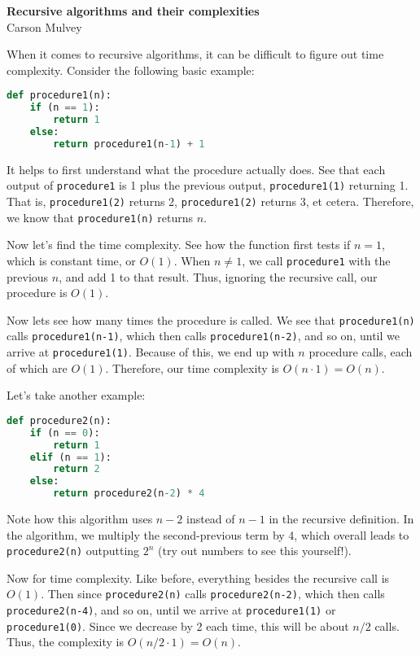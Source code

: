 \documentclass[11pt,letterpaper,dvipsnames]{article}
\begin{document}

\begin{center}
    \begin{large}
        \textbf{Recursive algorithms and their complexities} \\
        Carson Mulvey
    \end{large}
\end{center}

When it comes to recursive algorithms, it can be difficult to figure out time complexity. Consider the following basic example:
\begin{lstlisting}[language=Python]    
def procedure1(n):
    if (n == 1):
        return 1
    else:
        return procedure1(n-1) + 1
\end{lstlisting}

It helps to first understand what the procedure actually does. See that each output of \texttt{procedure1} is 1 plus the previous output, \texttt{procedure1(1)} returning 1. That is, \texttt{procedure1(2)} returns 2, \texttt{procedure1(2)} returns 3, et cetera. Therefore, we know that \texttt{procedure1(n)} returns $n$.

Now let's find the time complexity. See how the function first tests if $n=1$, which is constant time, or $O(1)$. When $n\neq 1$, we call \texttt{procedure1} with the previous $n$, and add 1 to that result. Thus, ignoring the recursive call, our procedure is $O(1)$.

Now lets see how many times the procedure is called. We see that \texttt{procedure1(n)} calls \texttt{procedure1(n-1)}, which then calls \texttt{procedure1(n-2)}, and so on, until we arrive at \texttt{procedure1(1)}. Because of this, we end up with $n$ procedure calls, each of which are $O(1)$. Therefore, our time complexity is $O(n\cdot 1)=O(n)$.

Let's take another example:
\begin{lstlisting}[language=Python]    
def procedure2(n):
    if (n == 0):
        return 1
    elif (n == 1):
        return 2
    else:
        return procedure2(n-2) * 4
\end{lstlisting}

Note how this algorithm uses $n-2$ instead of $n-1$ in the recursive definition. In the algorithm, we multiply the second-previous term by 4, which overall leads to \texttt{procedure2(n)} outputting $2^n$ (try out numbers to see this yourself!).

Now for time complexity. Like before, everything besides the recursive call is $O(1)$. Then since \texttt{procedure2(n)} calls \texttt{procedure2(n-2)}, which then calls \texttt{procedure2(n-4)}, and so on, until we arrive at \texttt{procedure1(1)} or \texttt{procedure1(0)}. Since we decrease by 2 each time, this will be about $n/2$ calls. Thus, the complexity is $O(n/2\cdot 1)=O(n)$.
\end{document}
